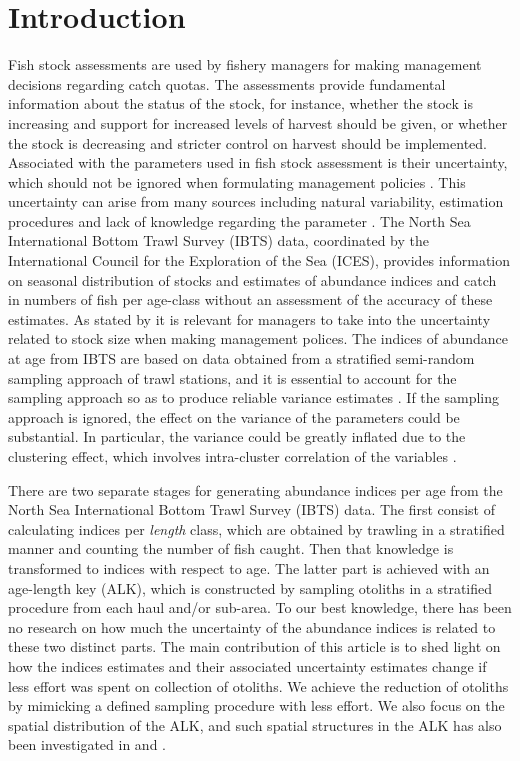 \documentclass[a4paper 12pt]{article}
\numberwithin{equation}{section}
\begin{document}
\section{Introduction}
Fish stock assessments are used by fishery managers for making management decisions regarding catch quotas. The assessments provide fundamental information about the status of the stock, for instance, whether the stock is increasing and support for increased levels of harvest should be given, or whether the stock is decreasing and stricter control on harvest should be implemented. Associated with the parameters used in fish stock assessment is their uncertainty, which should not be ignored when formulating management policies \citep{walters1981effects, ludwig1981measurement, berg2014evaluation}. This uncertainty can arise from many sources including natural variability, estimation procedures and lack of knowledge regarding the parameter \citep{ehrhardt1997role}. The North Sea International Bottom Trawl Survey (IBTS) data, coordinated by the International Council for the Exploration of the Sea (ICES), provides information on seasonal distribution of stocks and estimates of abundance indices and catch in numbers of fish per age-class without an assessment of the accuracy of these estimates. As stated by \citet{ludwig1981measurement} it is relevant for managers to take into the uncertainty related to stock size when making management polices. The indices of abundance at age from IBTS  are based on data obtained from a stratified semi-random sampling approach of trawl stations,  and  it is essential to account for the sampling approach so as to produce reliable variance estimates \citep{lehtonen2004practical}. If the sampling approach is ignored, the effect on the variance  of the parameters could be substantial.  In particular, the variance could be greatly inflated  due to the clustering effect, which involves intra-cluster correlation of the variables \citep{aanes2015efficient, lehtonen2004practical}. 

There are two separate stages for generating abundance indices per age from the North Sea International Bottom Trawl Survey (IBTS) data.  The first consist of calculating indices per \textit{length} class, which are obtained by trawling in a stratified manner and counting the number of fish caught. Then that knowledge is transformed to indices with respect to age. The latter part is achieved with an age-length key (ALK), which is constructed by sampling otoliths in a stratified procedure from each haul and/or sub-area. To our best knowledge, there has been no research on how much the uncertainty of the abundance indices is related to these two distinct parts. The main contribution of this article is to shed light on how the indices estimates and their associated uncertainty estimates change if less effort was spent on collection of otoliths. We achieve the reduction of otoliths by mimicking a defined sampling procedure with less effort. We also focus on the spatial distribution of the ALK, and such spatial structures in the ALK has also been investigated in \citet{berg2012spatial} and  \citet{hirst2012bayesian}.
\end{document}
